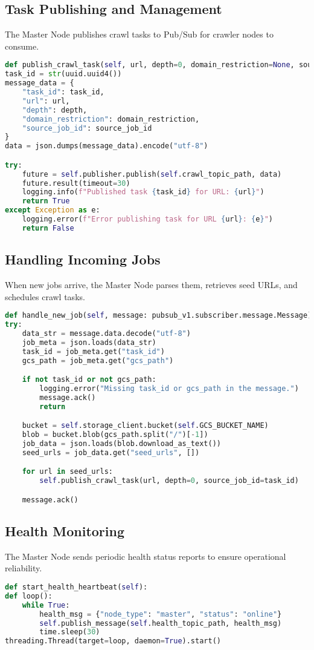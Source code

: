 \documentclass[12pt,a4paper]{report}
\begin{document}
\subsection{Task Publishing and Management}
The Master Node publishes crawl tasks to Pub/Sub for crawler nodes to consume.
\begin{lstlisting}[language=Python]
def publish_crawl_task(self, url, depth=0, domain_restriction=None, source_job_id=None):
task_id = str(uuid.uuid4())
message_data = {
    "task_id": task_id,
    "url": url,
    "depth": depth,
    "domain_restriction": domain_restriction,
    "source_job_id": source_job_id
}
data = json.dumps(message_data).encode("utf-8")

try:
    future = self.publisher.publish(self.crawl_topic_path, data)
    future.result(timeout=30)
    logging.info(f"Published task {task_id} for URL: {url}")
    return True
except Exception as e:
    logging.error(f"Error publishing task for URL {url}: {e}")
    return False
\end{lstlisting}

\subsection{Handling Incoming Jobs}
When new jobs arrive, the Master Node parses them, retrieves seed URLs, and schedules crawl tasks.
\begin{lstlisting}[language=Python]
def handle_new_job(self, message: pubsub_v1.subscriber.message.Message):
try:
    data_str = message.data.decode("utf-8")
    job_meta = json.loads(data_str)
    task_id = job_meta.get("task_id")
    gcs_path = job_meta.get("gcs_path")

    if not task_id or not gcs_path:
        logging.error("Missing task_id or gcs_path in the message.")
        message.ack()
        return

    bucket = self.storage_client.bucket(self.GCS_BUCKET_NAME)
    blob = bucket.blob(gcs_path.split("/")[-1])
    job_data = json.loads(blob.download_as_text())
    seed_urls = job_data.get("seed_urls", [])

    for url in seed_urls:
        self.publish_crawl_task(url, depth=0, source_job_id=task_id)

    message.ack()
\end{lstlisting}

\subsection{Health Monitoring}
The Master Node sends periodic health status reports to ensure operational reliability.
\begin{lstlisting}[language=Python]
def start_health_heartbeat(self):
def loop():
    while True:
        health_msg = {"node_type": "master", "status": "online"}
        self.publish_message(self.health_topic_path, health_msg)
        time.sleep(30)
threading.Thread(target=loop, daemon=True).start()
\end{lstlisting}
\newpage
\end{document}
